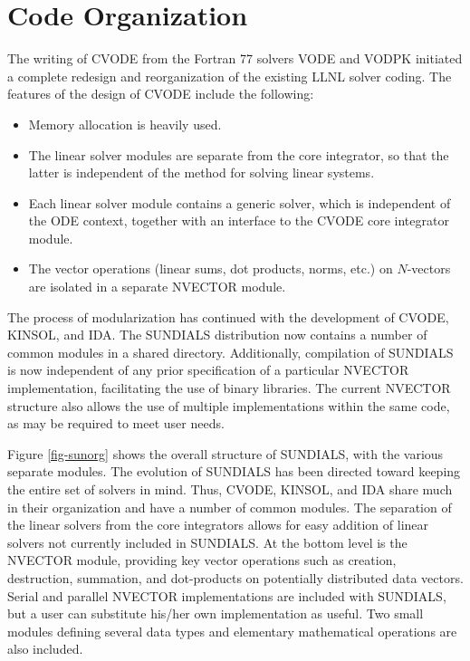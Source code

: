\section{Code Organization}
\label{s:organization}

The writing of CVODE from the Fortran 77 solvers VODE and VODPK
initiated a complete redesign and reorganization of the existing
LLNL solver coding. The features of the design of CVODE include
the following:
\begin{itemize}
\item Memory allocation is heavily used.
\item The linear solver modules are separate from the core integrator,
so that the latter is independent of the method for solving linear
systems.
\item Each linear solver module contains  a generic solver, which is
independent of the ODE context, together with an interface to the CVODE core
integrator module.
\item The vector operations  (linear sums, dot products, norms, etc.) on
$N$-vectors are isolated in a separate NVECTOR module.
\end{itemize}

The process of modularization has continued with the development of CVODE,
KINSOL, and IDA. The SUNDIALS distribution now contains a number of common
modules in a shared directory. Additionally, compilation of SUNDIALS is now
independent of any prior specification of a particular NVECTOR
implementation, facilitating the use of binary libraries. The current
NVECTOR structure also allows the use of multiple implementations within the
same code, as may be required to meet user needs.

Figure \ref{fig-sunorg} shows the overall structure of SUNDIALS, with the
various separate modules. The evolution of SUNDIALS has been directed toward
keeping the entire set of solvers in mind. Thus, CVODE, KINSOL, and IDA share
much in their organization and have a number of common modules.  The
separation of the linear solvers from the core integrators allows for easy
addition of linear solvers not currently included in SUNDIALS. At the bottom
level is the NVECTOR module, providing key vector operations such as
creation, destruction, summation, and dot-products on potentially
distributed data vectors. Serial and parallel NVECTOR implementations are
included with SUNDIALS, but a user can substitute his/her own implementation
as useful. Two small modules defining several data types and elementary
mathematical operations are also included.

